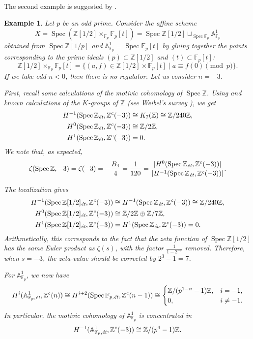 \documentclass{article}
\DeclareMathOperator{\Spec}{Spec}
\newcommand{\FF}{\mathbb{F}}
\newcommand{\ZZ}{\mathbb{Z}}
\renewcommand{\AA}{\mathbb{A}}
\newcommand{\et}{\text{\it \'{e}t}}
\theoremstyle{myplain}
\theoremstyle{mydefinition}
\newtheorem{example}[theorem]{Example}
\begin{document}
The second example is suggested by \cite[\S 7]{Jordan-Poonen-2020}.

\begin{example}
  Let $p$ be an odd prime. Consider the affine scheme
  \[ X = \Spec (\ZZ [1/2] \times_{\FF_p} \FF_p [t]) =
    \Spec \ZZ [1/2] \mathop{\sqcup}_{\Spec \FF_p} \AA^1_{\FF_p} \]
  obtained from $\Spec \ZZ [1/p]$ and $\AA^1_{\FF_p} = \Spec \FF_p [t]$ by
  gluing together the points corresponding to the prime ideals
  $(p) \subset \ZZ [1/2]$ and $(t) \subset \FF_p [t]$:
  \[ \ZZ [1/2] \times_{\FF_p} \FF_p [t] =
    \{ (a,f) \in \ZZ [1/2] \times \FF_p [t] \mid a \equiv f (0) \pmod{p} \}. \]
  If we take odd $n < 0$, then there is no regulator. Let us consider $n = -3$.

  First, recall some calculations of the motivic cohomology of $\Spec \ZZ$.
  Using \cite[Proposition~2.1]{Kolster-Sands-2008} and known calculations of the
  $K$-groups of $\ZZ$ (see Weibel's survey \cite{Weibel-2005}), we get
  \begin{align*}
    H^{-1} (\Spec \ZZ_\et, \ZZ^c (-3)) & \cong K_7 (\ZZ) \cong \ZZ/240\ZZ, \\
    H^0 (\Spec \ZZ_\et, \ZZ^c (-3)) & \cong \ZZ/2\ZZ, \\
    H^1 (\Spec \ZZ_\et, \ZZ^c (-3)) & = 0.
  \end{align*}
  We note that, as expected,
  \[ \zeta (\Spec \ZZ, -3) = \zeta (-3) = -\frac{B_4}{4} = \frac{1}{120} =
    \frac{|H^0 (\Spec \ZZ_\et, \ZZ^c (-3))|}{|H^{-1} (\Spec \ZZ_\et, \ZZ^c (-3))|}. \]

  The localization gives
  \begin{align*}
    H^{-1} (\Spec \ZZ [1/2]_\et, \ZZ^c (-3)) & \cong H^{-1} (\Spec \ZZ_\et, \ZZ^c (-3)) \cong \ZZ/240\ZZ, \\
    H^0 (\Spec \ZZ [1/2]_\et, \ZZ^c (-3)) & \cong \ZZ/2\ZZ \oplus \ZZ/7\ZZ, \\
    H^1 (\Spec \ZZ [1/2]_\et, \ZZ^c (-3)) & = H^1 (\Spec \ZZ_\et, \ZZ^c (-3)) = 0.
  \end{align*}
  Arithmetically, this corresponds to the fact that the zeta function of
  $\Spec \ZZ [1/2]$ has the same Euler product as $\zeta (s)$, with the factor
  $\frac{1}{1-2^{-s}}$ removed. Therefore, when $s = -3$, the zeta-value should
  be corrected by $2^3 - 1 = 7$.

  For $\AA^1_{\FF_p}$, we now have
  \[ H^i (\AA^1_{\FF_p, \et}, \ZZ^c (n)) \cong
    H^{i+2} (\Spec \FF_{p,\et}, \ZZ^c (n-1)) \cong
    \begin{cases}
      \ZZ/(p^{1-n} - 1)\ZZ, & i = -1, \\
      0, & i \ne -1.
    \end{cases} \]
  In particular, the motivic cohomology of $\AA^1_{\FF_p}$ is concentrated in
  \[ H^{-1} (\AA^1_{\FF_p, \et}, \ZZ^c (-3)) \cong \ZZ/(p^4-1)\ZZ. \]


\end{example}
\end{document}

